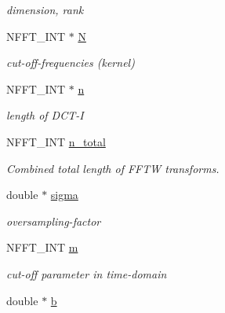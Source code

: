 \begin{DoxyCompactItemize}
\begin{DoxyCompactList}\small\item\em dimension, rank \end{DoxyCompactList}\item 
\hypertarget{structnfct__plan_a0a14650a8d16ae0da7fcdb514e8eafc7}{N\-F\-F\-T\-\_\-\-I\-N\-T $\ast$ \hyperlink{structnfct__plan_a0a14650a8d16ae0da7fcdb514e8eafc7}{N}}\label{structnfct__plan_a0a14650a8d16ae0da7fcdb514e8eafc7}

\begin{DoxyCompactList}\small\item\em cut-\/off-\/frequencies (kernel) \end{DoxyCompactList}\item 
\hypertarget{structnfct__plan_ac52b6c0dd44762f479d1b191f65ab5b3}{N\-F\-F\-T\-\_\-\-I\-N\-T $\ast$ \hyperlink{structnfct__plan_ac52b6c0dd44762f479d1b191f65ab5b3}{n}}\label{structnfct__plan_ac52b6c0dd44762f479d1b191f65ab5b3}

\begin{DoxyCompactList}\small\item\em length of D\-C\-T-\/\-I \end{DoxyCompactList}\item 
N\-F\-F\-T\-\_\-\-I\-N\-T \hyperlink{structnfct__plan_a68ddfb06f47a32b4b7bd2ce6c86e430f}{n\-\_\-total}
\begin{DoxyCompactList}\small\item\em Combined total length of F\-F\-T\-W transforms. \end{DoxyCompactList}\item 
\hypertarget{structnfct__plan_a56c9f580f79fb7605ae21bcbb729a8b9}{double $\ast$ \hyperlink{structnfct__plan_a56c9f580f79fb7605ae21bcbb729a8b9}{sigma}}\label{structnfct__plan_a56c9f580f79fb7605ae21bcbb729a8b9}

\begin{DoxyCompactList}\small\item\em oversampling-\/factor \end{DoxyCompactList}\item 
\hypertarget{structnfct__plan_a80b9e02b714d933fabadb2105c3dcfdb}{N\-F\-F\-T\-\_\-\-I\-N\-T \hyperlink{structnfct__plan_a80b9e02b714d933fabadb2105c3dcfdb}{m}}\label{structnfct__plan_a80b9e02b714d933fabadb2105c3dcfdb}

\begin{DoxyCompactList}\small\item\em cut-\/off parameter in time-\/domain \end{DoxyCompactList}\item 
\hypertarget{structnfct__plan_af1c2c2fe35f5b574a39109bb7b176270}{double $\ast$ \hyperlink{structnfct__plan_af1c2c2fe35f5b574a39109bb7b176270}{b}}\label{structnfct__plan_af1c2c2fe35f5b574a39109bb7b176270}


\end{DoxyCompactItemize}
